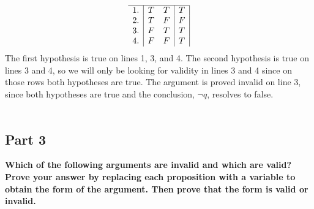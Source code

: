 \documentclass{amsart}
\theoremstyle{definition}
\theoremstyle{Exercise}
\theoremstyle{remark}
\theoremstyle{rule}
\numberwithin{equation}{section}
\begin{document}
\begin{enumerate}[label=(\alph*)]
\begin{displaymath}
\begin{array}{c|c c|c|}
 \hline
 1. & T & T & T\\
 2. & T & F & F\\
 3. & F & T & T\\
 4. & F & F & T\\
 \end{array}
 \end{displaymath}
 The first hypothesis is true on lines 1, 3, and 4. The second hypothesis is true on lines 3 and 4, so we will only be looking for validity in lines 3 and 4 since on those rows both hypotheses are true. The argument is proved invalid on line 3, since both hypotheses are true and the conclusion, $\neg q$, resolves to false.
\\\\
\end{enumerate}

\subsection*{Part 3}
{\bf Which of the following arguments are invalid and which are valid? Prove your answer by replacing each proposition with a variable to obtain the form of the argument. Then prove that the form is valid or invalid.}\\
\end{document}

